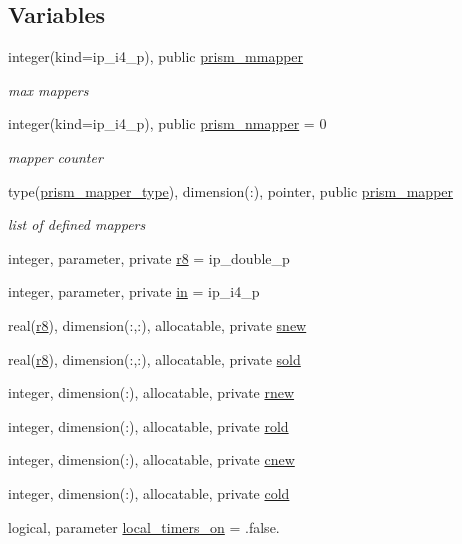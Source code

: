 \subsection*{Variables}
\begin{DoxyCompactItemize}
\item 
integer(kind=ip\+\_\+i4\+\_\+p), public \hyperlink{namespacemod__oasis__map_ab15f72e9f33a67181edc977c06b951e2}{prism\+\_\+mmapper}
\begin{DoxyCompactList}\small\item\em max mappers \end{DoxyCompactList}\item 
integer(kind=ip\+\_\+i4\+\_\+p), public \hyperlink{namespacemod__oasis__map_af543b83ec5bed63a4448ff641137b0c5}{prism\+\_\+nmapper} = 0
\begin{DoxyCompactList}\small\item\em mapper counter \end{DoxyCompactList}\item 
type(\hyperlink{structmod__oasis__map_1_1prism__mapper__type}{prism\+\_\+mapper\+\_\+type}), dimension(\+:), pointer, public \hyperlink{namespacemod__oasis__map_a00ad53f61b6998938fca792455487f7e}{prism\+\_\+mapper}
\begin{DoxyCompactList}\small\item\em list of defined mappers \end{DoxyCompactList}\item 
integer, parameter, private \hyperlink{namespacemod__oasis__map_a30ebe320b9e4c06a1ee1f2a0bbacf2c4}{r8} = ip\+\_\+double\+\_\+p
\item 
integer, parameter, private \hyperlink{namespacemod__oasis__map_aa58997467050224f6db2bc93fe5f7ca1}{in} = ip\+\_\+i4\+\_\+p
\item 
real(\hyperlink{namespacemod__oasis__map_a30ebe320b9e4c06a1ee1f2a0bbacf2c4}{r8}), dimension(\+:,\+:), allocatable, private \hyperlink{namespacemod__oasis__map_a28b59479c467c58995c6300071ca140a}{snew}
\item 
real(\hyperlink{namespacemod__oasis__map_a30ebe320b9e4c06a1ee1f2a0bbacf2c4}{r8}), dimension(\+:,\+:), allocatable, private \hyperlink{namespacemod__oasis__map_a1fc7e7f295910352524d442c5d0dbf79}{sold}
\item 
integer, dimension(\+:), allocatable, private \hyperlink{namespacemod__oasis__map_a2575785d3ea5e1a37c7f6303f00eb727}{rnew}
\item 
integer, dimension(\+:), allocatable, private \hyperlink{namespacemod__oasis__map_a2931a6f582d0173cc0e6b155b8cb55b7}{rold}
\item 
integer, dimension(\+:), allocatable, private \hyperlink{namespacemod__oasis__map_a8ae737bd62499fe60ebb48d04ad3b6dd}{cnew}
\item 
integer, dimension(\+:), allocatable, private \hyperlink{namespacemod__oasis__map_a479ecc5b0be5d1adf3973cb08c40d30a}{cold}
\item 
logical, parameter \hyperlink{namespacemod__oasis__map_a0d8a50381f5e15cf11c1c845348c5062}{local\+\_\+timers\+\_\+on} = .false.
\end{DoxyCompactItemize}


